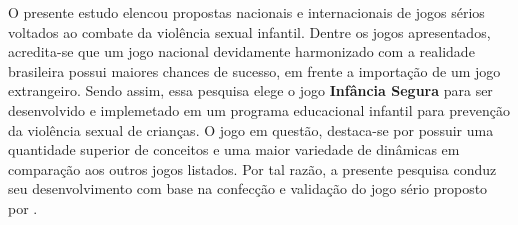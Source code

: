 O presente estudo elencou propostas nacionais e internacionais de jogos sérios voltados ao combate da violência sexual infantil. Dentre os jogos apresentados, acredita-se que um jogo nacional devidamente harmonizado com a realidade brasileira possui maiores chances de sucesso, em frente a importação de um jogo extrangeiro. Sendo assim, essa pesquisa elege o jogo \textbf{Infância Segura} para ser desenvolvido e implemetado em um programa educacional infantil para prevenção da violência sexual de crianças. O jogo em questão, destaca-se por possuir uma quantidade superior de conceitos e uma maior variedade de dinâmicas em comparação aos outros jogos listados. Por tal razão, a presente pesquisa conduz seu desenvolvimento com base na confecção e validação do jogo sério proposto por .













